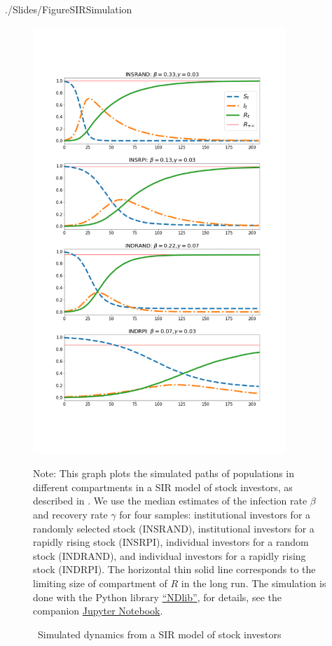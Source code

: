 \begin{verbatimwrite}{./Slides/FigureSIRSimulation}%
  \begin{figure} \centering  %
    \caption{ ~Simulated dynamics from a SIR model of stock investors}
    \label{fig:sir_simulate}
    \centerline{\includegraphics[width=0.85\textwidth,height=0.85\textheight]{./figures/sir_simulate}}
    \begin{flushleft}
      {\footnotesize Note: This graph plots the simulated paths of populations in different compartments in a SIR model of stock investors, as described in \cite{shiller1989survey}. We use the median estimates of the infection rate $\beta$ and recovery rate $\gamma$ for four samples: institutional investors for a randomly selected stock (INSRAND), institutional investors for a rapidly rising stock (INSRPI), individual investors for a random stock (INDRAND), and individual investors for a rapidly rising stock (INDRPI). The horizontal thin solid line corresponds to the limiting size of compartment of $R$ in the long run. The simulation is done with the Python library \href{https://ndlib.readthedocs.io/en/latest/}{``NDlib''}, for details, see the companion \href{https://github.com/llorracc/EpiExp/blob/master/SIR_Ndlib.ipynb}{Jupyter Notebook}. }
    \end{flushleft}
  \end{figure}
\end{verbatimwrite}%

